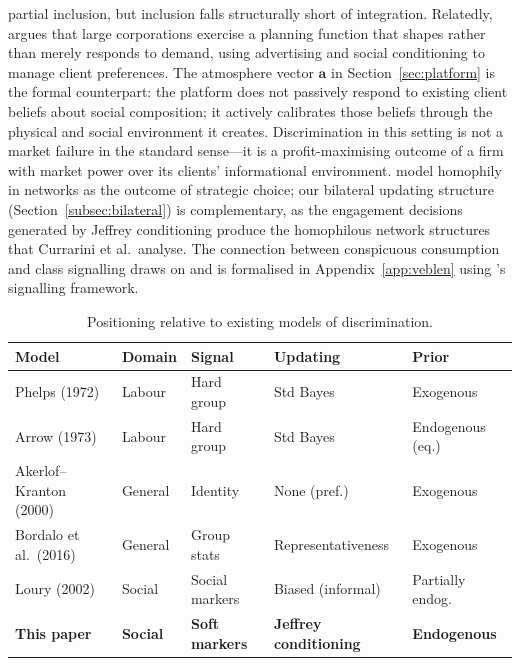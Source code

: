 \documentclass[12pt,a4paper]{article}
\theoremstyle{definition}
\numberwithin{proposition}{subsection}
\begin{document}
partial inclusion, but inclusion falls structurally short of
integration. Relatedly, \citet{Galbraith1967} argues that large
corporations exercise a planning function that shapes rather than
merely responds to demand, using advertising and social conditioning
to manage client preferences. The atmosphere vector $\mathbf{a}$ in
Section~\ref{sec:platform} is the formal counterpart: the platform
does not passively respond to existing client beliefs about social
composition; it actively calibrates those beliefs through the
physical and social environment it creates. Discrimination in this
setting is not a market failure in the standard sense---it is a
profit-maximising outcome of a firm with market power over its
clients' informational environment. \citet{CurrariniEtal2009} model
homophily in networks as the outcome of strategic choice; our
bilateral updating structure
(Section~\ref{subsec:bilateral}) is complementary, as the engagement
decisions generated by Jeffrey conditioning produce the homophilous
network structures that Currarini et al.\ analyse. The connection
between conspicuous consumption and class signalling draws on
\citet{Veblen1899} and is formalised in
Appendix~\ref{app:veblen} using \citet{Spence1973}'s signalling
framework.

\begin{table}[t]
\centering
\renewcommand{\arraystretch}{1.3}
\small
\begin{tabular}{lllll}
\toprule
\textbf{Model} & \textbf{Domain} & \textbf{Signal} &
\textbf{Updating} & \textbf{Prior} \\
\midrule
Phelps (1972)           & Labour  & Hard group    & Std Bayes        & Exogenous \\
Arrow (1973)            & Labour  & Hard group    & Std Bayes        & Endogenous (eq.) \\
Akerlof--Kranton (2000) & General & Identity      & None (pref.)     & Exogenous \\
Bordalo et al.\ (2016)  & General & Group stats   & Representativeness & Exogenous \\
Loury (2002)            & Social  & Social markers & Biased (informal) & Partially endog. \\
\textbf{This paper}     & \textbf{Social} & \textbf{Soft markers} &
\textbf{Jeffrey conditioning} & \textbf{Endogenous} \\
\bottomrule
\end{tabular}
\caption{Positioning relative to existing models of discrimination.}
\label{tab:positioning}
\end{table}
\end{document}
